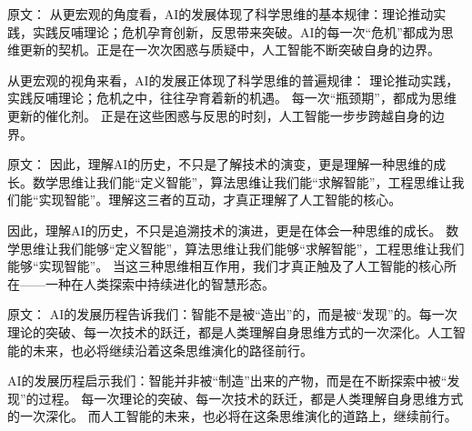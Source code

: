 原文：
从更宏观的角度看，AI的发展体现了科学思维的基本规律：理论推动实践，实践反哺理论；危机孕育创新，反思带来突破。AI的每一次“危机”都成为思维更新的契机。正是在一次次困惑与质疑中，人工智能不断突破自身的边界。

从更宏观的视角来看，AI的发展正体现了科学思维的普遍规律：  
理论推动实践，实践反哺理论；危机之中，往往孕育着新的机遇。  
每一次“瓶颈期”，都成为思维更新的催化剂。  
正是在这些困惑与反思的时刻，人工智能一步步跨越自身的边界。

原文：
因此，理解AI的历史，不只是了解技术的演变，更是理解一种思维的成长。数学思维让我们能“定义智能”，算法思维让我们能“求解智能”，工程思维让我们能“实现智能”。理解这三者的互动，才真正理解了人工智能的核心。

因此，理解AI的历史，不只是追溯技术的演进，更是在体会一种思维的成长。  
数学思维让我们能够“定义智能”，算法思维让我们能够“求解智能”，工程思维让我们能够“实现智能”。  
当这三种思维相互作用，我们才真正触及了人工智能的核心所在——一种在人类探索中持续进化的智慧形态。

原文：
AI的发展历程告诉我们：智能不是被“造出”的，而是被“发现”的。每一次理论的突破、每一次技术的跃迁，都是人类理解自身思维方式的一次深化。人工智能的未来，也必将继续沿着这条思维演化的路径前行。

AI的发展历程启示我们：智能并非被“制造”出来的产物，而是在不断探索中被“发现”的过程。  
每一次理论的突破、每一次技术的跃迁，都是人类理解自身思维方式的一次深化。  
而人工智能的未来，也必将在这条思维演化的道路上，继续前行。





